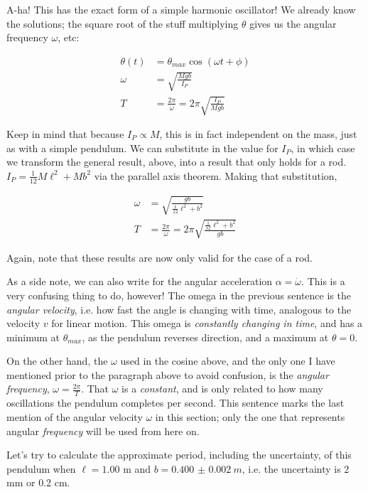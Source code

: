 A-ha! This has the exact form of a simple harmonic oscillator! We already know the solutions; the square root of the stuff multiplying $\theta$ gives us the angular frequency $\omega$, etc:

\begin{align}
\theta(t) &= \theta_{max} \cos(\omega t + \phi)\\
\omega    &= \sqrt{\frac{M g b}{I_P}}\\
T         &= \frac{2 \pi}{\omega} = 2 \pi \sqrt{\frac{I_P}{M g b}}
\end{align}

Keep in mind that because $I_P \propto M$, this is in fact independent on the mass, just as with a simple pendulum. We can substitute in the value for $I_P$, in which case we transform the general result, above, into a result that only holds for a rod.\\
$I_P = \frac{1}{12} M \ell^2 + M b^2$ via the parallel axis theorem. Making that substitution,

\begin{align}
\omega    &= \sqrt{\frac{g b}{\frac{1}{12} \ell^2 + b^2}}\\
T         &= \frac{2 \pi}{\omega} = 2 \pi \sqrt{\frac{\frac{1}{12} \ell^2 + b^2}{g b}}
\end{align}

Again, note that these results are now only valid for the case of a rod.

As a side note, we can also write for the angular acceleration $\alpha = \dot{\omega}$. This is a very confusing thing to do, however! The omega in the previous sentence is the \emph{angular velocity}, i.e. how fast the angle is changing with time, analogous to the velocity $v$ for linear motion. This omega is \emph{constantly changing in time}, and has a minimum at $\theta_{max}$, as the pendulum reverses direction, and a maximum at $\theta = 0$.

On the other hand, the $\omega$ used in the cosine above, and the only one I have mentioned prior to the paragraph above to avoid confusion, is the \emph{angular frequency}, $\displaystyle \omega = \frac{2 \pi}{T}$. That $\omega$ is a \emph{constant}, and is only related to how many oscillations the pendulum completes per second. This sentence marks the last mention of the angular velocity $\omega$ in this section; only the one that represents angular \emph{frequency} will be used from here on.

Let's try to calculate the approximate period, including the uncertainty, of this pendulum when $\ell = 1.00$ m and $b = \SI{0.400(2)}{m}$, i.e. the uncertainty is 2 mm or 0.2 cm.

